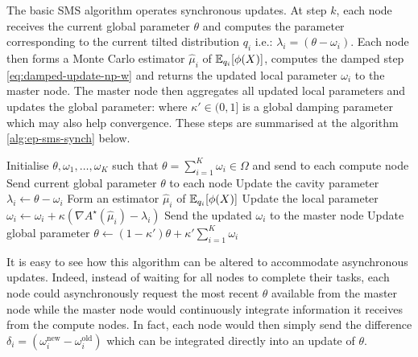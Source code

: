 The basic SMS algorithm operates synchronous updates.
At step $k$, each node receives the current global parameter $\theta$ and computes the parameter corresponding to the current tilted distribution $q_i$ i.e.: $\lambda_i=(\theta-\omega_i)$. Each node then forms a Monte Carlo estimator $\hat\mu_i$ of $\mathbb E_{q_i}[\phi(X)]$, computes the damped step \eqref{eq:damped-update-np-w} and returns the updated local parameter $\omega_i$ to the master node. 
The master node then aggregates all updated local parameters and updates the global parameter: 
%
%
where $\kappa' \in (0,1]$ is a global damping parameter which may also help convergence. 
These steps are summarised at the algorithm \ref{alg:ep-sms-synch} below.

\begin{algorithm}[!h]\small
	\caption{\label{alg:ep-sms-synch}}
	\begin{algorithmic}[1]
	\State Initialise $\theta,\omega_{1},\dots,\omega_{K}$ such that $\theta=\sum_{i=1}^{K}\omega_{i} \in \Omega$ and send to each compute node
		\State Send current global parameter $\theta$ to each node
			\State Update the cavity parameter $\lambda_{i}\leftarrow\theta-\omega_{i}$
			\State Form an estimator $\hat\mu_{i}$ of $\mathbb E_{q_{i}}[\phi(X)]$
			\State Update the local parameter $\omega_{i}\leftarrow\omega_{i}+\kappa(\nabla A^{\star}(\hat\mu_{i})-\lambda_i)$
			\State Send the updated $\omega_{i}$ to the master node
		\EndFor
		\State Update global parameter $\theta\leftarrow (1-\kappa')\theta + \kappa'\sum_{i=1}^{K}\omega_{i}$
	\EndFor\\	
	\Return{$\theta$}
	\end{algorithmic}
\end{algorithm} 

It is easy to see how this algorithm can be altered to accommodate asynchronous updates. Indeed, instead of waiting for all nodes to complete their tasks, each node could asynchronously request the most recent $\theta$ available from the master node while the master node would continuously integrate information it receives from the compute nodes. In fact, each node would then simply send the difference $\delta_{i} = (\omega_{i}^{\text{new}}-\omega_{i}^{\text{old}})$ which can be integrated directly into an update of $\theta$. 

